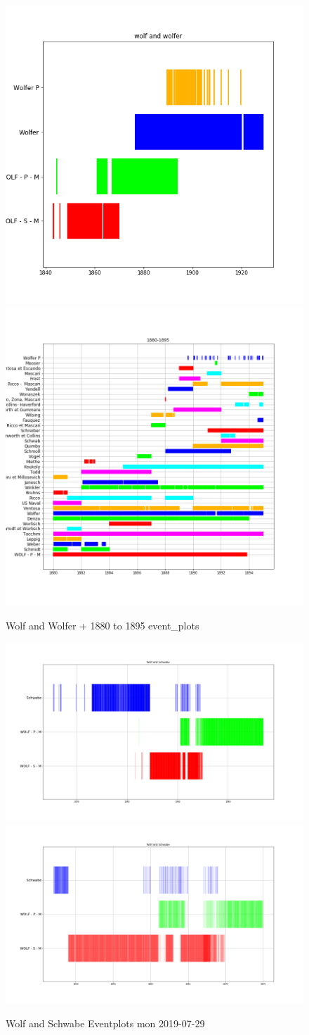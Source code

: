\documentclass[12pt]{article}
\begin{document}
\begin{figure}[H]
    \includegraphics[width=0.5\linewidth]{wolf_wolfer_event_plot.png}
    \includegraphics[width=0.5\linewidth]{event_1880_1895.png}
    \caption{Wolf and Wolfer + 1880 to 1895 event\_plots}
    \label{fig:eventplot wolf and wolfer and 1880 to 1895}
\end{figure}

\begin{figure}[H]
    \includegraphics[width=0.5\linewidth]{wolf_and_schwabe_eventplot.png}
    \includegraphics[width=0.5\linewidth]{wolf_and_schwabe_eventplot_1847_1875.png}
    \caption{Wolf and Schwabe Eventplots mon 2019-07-29}
    \label{fig:wolf and schwabe eventplots}
\end{figure}
\end{document}
